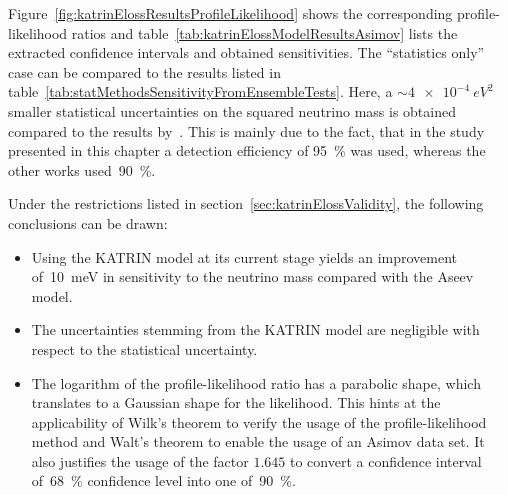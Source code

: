Figure~\ref{fig:katrinElossResultsProfileLikelihood} shows the corresponding profile-likelihood ratios and table~\ref{tab:katrinElossModelResultsAsimov} lists the extracted confidence intervals and obtained sensitivities. The ``statistics only'' case can be compared to the results listed in table~\ref{tab:statMethodsSensitivityFromEnsembleTests}. Here, a $\sim\SI{4e-4}{eV^2}$ smaller statistical uncertainties on the squared neutrino mass is obtained compared to the results by~\cite{Kleesiek2014, Hoetzel2012}. This is mainly due to the fact, that in the study presented in this chapter a detection efficiency of \SI{95}{\percent} was used, whereas the other works used~\SI{90}{\percent}.

Under the restrictions listed in section~\ref{sec:katrinElossValidity}, the following conclusions can be drawn:
\begin{itemize}
	\item Using the KATRIN model at its current stage yields an improvement of~\SI{10}{meV}  in sensitivity to the neutrino mass compared with the Aseev model.
	\item The uncertainties stemming from the KATRIN model are negligible with respect to the statistical uncertainty.
	\item The logarithm of the profile-likelihood ratio has a parabolic shape, which translates to a Gaussian shape for the likelihood. This hints at the applicability of  Wilk's theorem to verify the usage of the profile-likelihood method and Walt's theorem to enable the usage of an Asimov data set. It also justifies the usage of the factor $1.645$ to convert a confidence interval of~\SI{68}{\percent} confidence level into one of~\SI{90}{\percent}.
\end{itemize}

